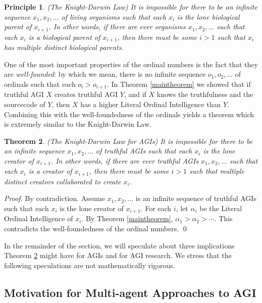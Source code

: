 \documentclass[runningheads]{llncs}
\newtheorem{mytheorem}{Theorem}
\newtheorem{myprinciple}[mytheorem]{Principle}
\begin{document}
\begin{myprinciple}
(The Knight-Darwin Law)
It is impossible for there to be an infinite sequence
$x_1,x_2,\ldots$ of living organisms such that each $x_i$
is the lone biological parent of $x_{i+1}$. In other words,
if there are ever organisms $x_1,x_2,\ldots$ such that each
$x_i$ is a biological parent of $x_{i+1}$, then there must
be some $i>1$ such that $x_i$ has multiple distinct biological
parents.
\end{myprinciple}

One of the most important properties of the ordinal numbers is the
fact that they are \emph{well-founded}: by which we mean, there is
no infinite sequence $o_1,o_2,\ldots$ of ordinals such that each
$o_i>o_{i+1}$. In Theorem \ref{maintheorem} we showed that if truthful
AGI $X$ creates truthful AGI $Y$, and if $X$ knows the truthfulness
and the sourcecode of $Y$, then $X$ has a higher Literal Ordinal Intelligence
than $Y$. Combining this with the well-foundedness of the ordinals yields
a theorem which is extremely similar to the Knight-Darwin Law.

\begin{mytheorem}
\label{maintheorem2}
(The Knight-Darwin Law for AGIs)
It is impossible for there to be an infinite sequence
$x_1,x_2,\ldots$ of truthful AGIs such that each $x_i$ is the lone creator of $x_{i+1}$.
In other words, if there are
ever truthful AGIs $x_1,x_2,\ldots$ such that each $x_i$ is a creator of $x_{i+1}$,
then there must be some $i>1$ such that multiple distinct creators collaborated to
create $x_i$.
\end{mytheorem}

\begin{proof}
By contradiction. Assume $x_1,x_2,\ldots$ is an infinite sequence of truthful AGIs such
that each $x_i$ is the lone creator of $x_{i+1}$. For each $i$, let $\alpha_i$
be the Literal Ordinal Intelligence of $x_i$. By Theorem \ref{maintheorem},
$\alpha_1>\alpha_2>\cdots$. This contradicts the well-foundedness of the ordinal
numbers.
\qed
\end{proof}

In the remainder of the section, we will speculate about three implications
Theorem \ref{maintheorem2} might have for AGIs and for AGI research.
We stress that the following speculations are not mathematically rigorous.

\subsection{Motivation for Multi-agent Approaches to AGI}
\end{document}
